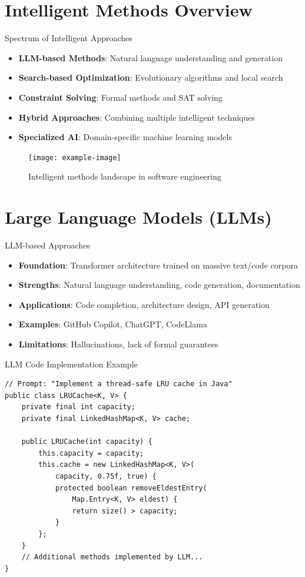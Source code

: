 \documentclass{beamer}
\begin{document}
\section{Intelligent Methods Overview}
\begin{frame}[t]{Spectrum of Intelligent Approaches}
\begin{itemize}
\item \textbf{LLM-based Methods}: Natural language understanding and generation
\item \textbf{Search-based Optimization}: Evolutionary algorithms and local search
\item \textbf{Constraint Solving}: Formal methods and SAT solving
\item \textbf{Hybrid Approaches}: Combining multiple intelligent techniques
\item \textbf{Specialized AI}: Domain-specific machine learning models
\end{itemize}
\begin{figure}
\texttt{[image: example-image]}
\caption{Intelligent methods landscape in software engineering}
\end{figure}
\end{frame}

\section{Large Language Models (LLMs)}
\begin{frame}[t]{LLM-based Approaches}
\begin{itemize}
\item \textbf{Foundation}: Transformer architecture trained on massive text/code corpora
\item \textbf{Strengths}: Natural language understanding, code generation, documentation
\item \textbf{Applications}: Code completion, architecture design, API generation
\item \textbf{Examples}: GitHub Copilot, ChatGPT, CodeLlama
\item \textbf{Limitations}: Hallucinations, lack of formal guarantees
\end{itemize}
\end{frame}

\begin{frame}[fragile,t]{LLM Code Implementation Example}
\begin{verbatim}
// Prompt: "Implement a thread-safe LRU cache in Java"
public class LRUCache<K, V> {
    private final int capacity;
    private final LinkedHashMap<K, V> cache;
    
    public LRUCache(int capacity) {
        this.capacity = capacity;
        this.cache = new LinkedHashMap<K, V>(
            capacity, 0.75f, true) {
            protected boolean removeEldestEntry(
                Map.Entry<K, V> eldest) {
                return size() > capacity;
            }
        };
    }
    // Additional methods implemented by LLM...
}
\end{verbatim}
\end{frame}
\end{document}
